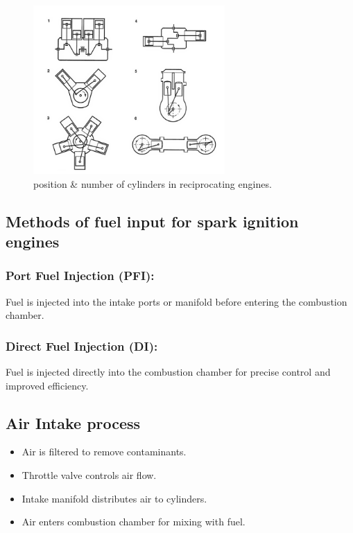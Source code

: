\documentclass{article}
\begin{document}
\begin{figure}[H]
  \centering
  \includegraphics[width=0.65\textwidth]{img/cylinders.png}
  \caption{position \& number of cylinders in reciprocating engines.}
  \label{fig:engine configuration}
\end{figure}

\subsection*{Methods of fuel input for spark ignition engines}
\subsubsection*{Port Fuel Injection (PFI):}
Fuel is injected into the intake ports or manifold before entering the combustion chamber.
\subsubsection*{Direct Fuel Injection (DI):}
Fuel is injected directly into the combustion chamber for precise control and improved efficiency.
\vspace{0.5cm}
\subsection*{Air Intake process}
\begin{itemize}
	\item Air is filtered to remove contaminants.
	\item Throttle valve controls air flow.
	\item Intake manifold distributes air to cylinders.
	\item Air enters combustion chamber for mixing with fuel.
\end{itemize}
\end{document}
